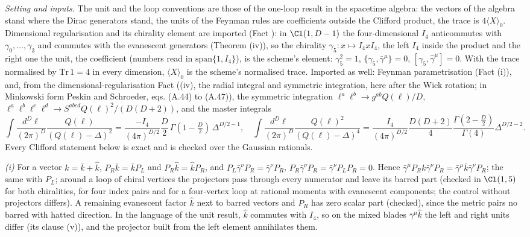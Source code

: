 \emph{Setting and inputs.} The unit and the loop conventions are those of the one-loop result in the spacetime algebra: the vectors of the algebra stand where the Dirac generators stand, the units of the Feynman rules are coefficients outside the Clifford product, the trace is $4\langle X\rangle_{0}$. Dimensional regularisation and its chirality element are imported (Fact ): in $\Cl(1, D-1)$ the four-dimensional $I_{4}$ anticommutes with $\gamma_{0}, \ldots, \gamma_{3}$ and commutes with the evanescent generators (Theorem (iv)), so the chirality $\gamma_{5}: x \mapsto I_{4}xI_{4}$, the left $I_{4}$ inside the product and the right one the unit, the coefficient (numbers read in $\mathrm{span}\{1, I_{4}\}$), is the scheme's element: $\gamma_{5}^{2} = 1$, $\{\gamma_{5}, \bar\gamma^{\mu}\} = 0$, $[\gamma_{5}, \hat\gamma^{\mu}] = 0$. With the trace normalised by $\mathrm{Tr}\,1 = 4$ in every dimension, $\langle X\rangle_{0}$ is the scheme's normalised trace. Imported as well: Feynman parametrisation (Fact (i)), and, from the dimensional-regularisation Fact ((iv), the radial integral and symmetric integration, here after the Wick rotation; in Minkowski form Peskin and Schroeder, eqs. (A.44) to (A.47)), the symmetric integration $\ell^{a}\ell^{b} \to g^{ab}Q(\ell)/D$, $\ell^{a}\ell^{b}\ell^{c}\ell^{d} \to S^{abcd}Q(\ell)^{2}/(D(D+2))$, and the master integrals
\[
\int\frac{d^{D}\ell}{(2\pi)^{D}}\frac{Q(\ell)}{(Q(\ell) - \Delta)^{2}} = \frac{-I_{4}}{(4\pi)^{D/2}}\frac{D}{2}\,\Gamma(1 - \tfrac{D}{2})\,\Delta^{D/2 - 1}, \quad \int\frac{d^{D}\ell}{(2\pi)^{D}}\frac{Q(\ell)^{2}}{(Q(\ell) - \Delta)^{4}} = \frac{I_{4}}{(4\pi)^{D/2}}\frac{D(D+2)}{4}\frac{\Gamma(2 - \tfrac{D}{2})}{\Gamma(4)}\Delta^{D/2 - 2}.
\]
Every Clifford statement below is exact and is checked over the Gaussian rationals.

\emph{(i)} For a vector $k = \bar k + \hat k$, $P_{R}\bar k = \bar kP_{L}$ and $P_{R}\hat k = \hat kP_{R}$, and $P_{L}\bar\gamma^{\nu}P_{R} = \bar\gamma^{\nu}P_{R}$, $P_{R}\bar\gamma^{\nu}P_{R} = \bar\gamma^{\nu}P_{L}P_{R} = 0$. Hence $\bar\gamma^{\mu}P_{R}k\bar\gamma^{\nu}P_{R} = \bar\gamma^{\mu}\bar k\bar\gamma^{\nu}P_{R}$; the same with $P_{L}$; around a loop of chiral vertices the projectors pass through every numerator and leave its barred part (checked in $\Cl(1,5)$ for both chiralities, for four index pairs and for a four-vertex loop at rational momenta with evanescent components; the control without projectors differs). A remaining evanescent factor $\hat k$ next to barred vectors and $P_{R}$ has zero scalar part (checked), since the metric pairs no barred with hatted direction. In the language of the unit result, $\hat k$ commutes with $I_{4}$, so on the mixed blades $\bar\gamma^{\mu}\hat k$ the left and right units differ (its clause (v)), and the projector built from the left element annihilates them.

